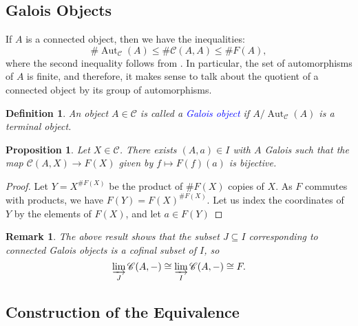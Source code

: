 \documentclass[10pt]{article}
\theoremstyle{thmstyle}
\newtheorem{proposition}[theorem]{Proposition}
\theoremstyle{defstyle}
\newtheorem{definition}[theorem]{Definition}
\newtheorem{remark}[theorem]{Remark}
\newcommand{\Aut}{\operatorname{Aut}}
\newcommand{\scrC}{\mathscr{C}} %
\newcommand{\define}[1]{\textcolor{blue}{\textit{#1}}}
\renewcommand{\le}{\leqslant}
\begin{document}
\subsection{Galois Objects}

If $A$ is a connected object, then we have the inequalities: 
\begin{equation*}
    \#\Aut_{\scrC}(A)\le\#\scrC(A, A)\le\# F(A),
\end{equation*}
where the second inequality follows from . In particular, the set of automorphisms of $A$ is finite, and therefore, it makes sense to talk about the quotient of a connected object by its group of automorphisms.

\begin{definition}
    An object $A\in\scrC$ is called a \define{Galois object} if $A/\Aut_{\scrC}(A)$ is a terminal object.
\end{definition}


\begin{proposition}
    Let $X\in\scrC$. There exists $(A, a)\in I$ with $A$ Galois such that the map $\scrC(A, X)\to F(X)$ given by $f\mapsto F(f)(a)$ is bijective.
\end{proposition}
\begin{proof}
    Let $Y = X^{\# F(X)}$ be the product of $\# F(X)$ copies of $X$. As $F$ commutes with products, we have $F(Y) = F(X)^{\# F(X)}$. Let us index the coordinates of $Y$ by the elements of $F(X)$, and let $a\in F(Y)$ %
\end{proof}

\begin{remark}
    The above result shows that the subset $J\subseteq I$ corresponding to connected Galois objects is a cofinal subset of $I$, so 
    \begin{equation*}
        \varinjlim_{J}\scrC(A, -)\cong\varinjlim_{I}\scrC(A, -)\cong F.
    \end{equation*}
\end{remark}

\subsection{Construction of the Equivalence}
\end{document}
